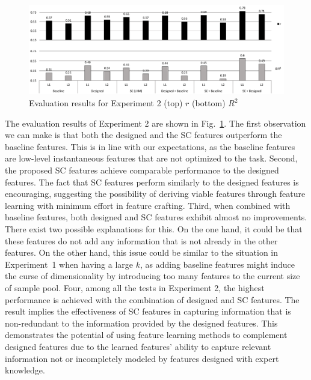 \documentclass[conference]{IEEEtran}
\begin{document}

\begin{figure}
\centering
\includegraphics[width = 17.2 cm]{./figs/exp2_remake.pdf}
\caption{Evaluation results for Experiment 2 (top) $r$ (bottom) $R^{2}$}
\label{fig:exp2}
\end{figure}




The evaluation results of Experiment 2 are shown in Fig.~\ref{fig:exp2}. The first observation we can make is that both the designed and the SC features outperform the baseline features. This is in line with our expectations, as the baseline features are low-level instantaneous features that are not optimized to the task. %
Second, the proposed SC features achieve comparable performance to the designed features. The fact that SC features perform similarly to the designed features is encouraging, suggesting the possibility of deriving viable features through feature learning with minimum effort in feature crafting. 
Third, when combined with baseline features, both designed and SC features exhibit almost no improvements. There exist two possible explanations for this. On the one hand, it could be that these features do not add any information that is not already in the other features. On the other hand, this issue could be similar to the situation in Experiment~1 when having a large $k$, as adding baseline features might induce the curse of dimensionality by introducing too many features to the current size of sample pool. %
Four, among all the tests in Experiment 2, the highest performance is achieved with the combination of designed and SC features. The result implies the effectiveness of SC features in capturing information that is non-redundant to the information provided by the designed features.
This demonstrates the potential of using feature learning methods to complement designed features due to the learned features' ability to capture relevant information not or incompletely modeled by features designed with expert knowledge.
\end{document}

